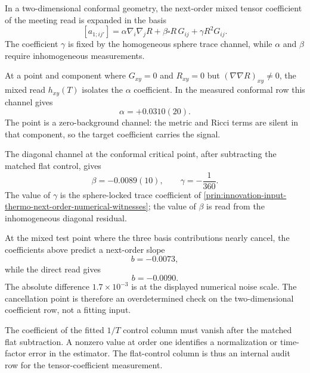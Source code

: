 \begin{definition}
\label{def:innovation-input-thermo-two-dimensional-next-order-basis}
In a two-dimensional conformal geometry, the next-order mixed tensor
coefficient of the meeting read is expanded in the basis
$$
[a_{1;ij'}]
=
\alpha\nabla_i\nabla_jR
+
\beta\square R\,G_{ij}
+
\gamma R^2G_{ij}.
$$
The coefficient $\gamma$ is fixed by the homogeneous sphere trace channel,
while $\alpha$ and $\beta$ require inhomogeneous measurements.
\end{definition}

\begin{principle}
\label{prin:innovation-input-thermo-zero-background-channel}
At a point and component where $G_{xy}=0$ and $R_{xy}=0$ but
$(\nabla\nabla R)_{xy}\ne0$, the mixed read $h_{xy}(T)$ isolates the
$\alpha$ coefficient. In the measured conformal row this channel gives
$$
\alpha=+0.0310(20).
$$
The point is a zero-background channel: the metric and Ricci terms are
silent in that component, so the target coefficient carries the signal.
\end{principle}

\begin{principle}
\label{prin:innovation-input-thermo-diagonal-coefficient-channel}
The diagonal channel at the conformal critical point, after subtracting
the matched flat control, gives
$$
\beta=-0.0089(10),
\qquad
\gamma=-\frac{1}{360}.
$$
The value of $\gamma$ is the sphere-locked trace coefficient of
\autoref{prin:innovation-input-thermo-next-order-numerical-witnesses};
the value of $\beta$ is read from the inhomogeneous diagonal residual.
\end{principle}

\begin{principle}
\label{prin:innovation-input-thermo-overdetermined-cancellation-point}
At the mixed test point where the three basis contributions nearly cancel,
the coefficients above predict a next-order slope
$$
b=-0.0073,
$$
while the direct read gives
$$
b=-0.0090.
$$
The absolute difference $1.7\times10^{-3}$ is at the displayed numerical
noise scale. The cancellation point is therefore an overdetermined check
on the two-dimensional coefficient row, not a fitting input.
\end{principle}

\begin{principle}
\label{prin:innovation-input-thermo-flat-control-column}
The coefficient of the fitted $1/T$ control column must vanish after the
matched flat subtraction. A nonzero value at order one identifies a
normalization or time-factor error in the estimator. The flat-control
column is thus an internal audit row for the tensor-coefficient
measurement.
\end{principle}

